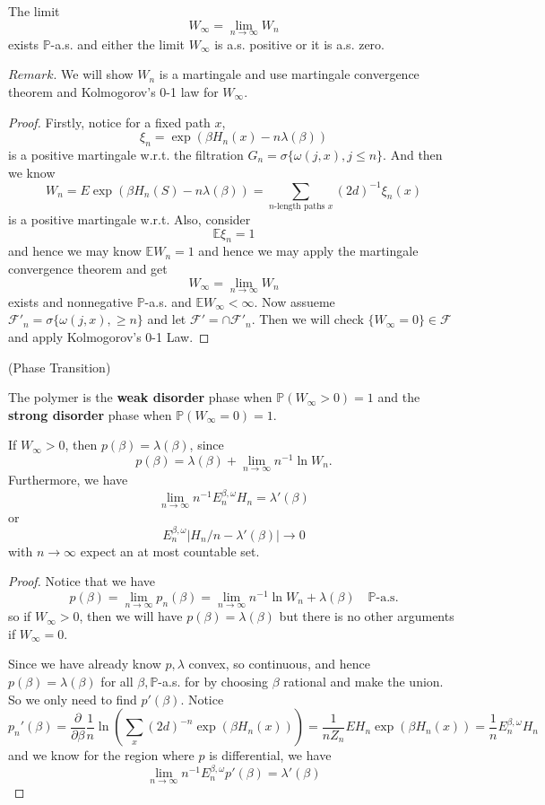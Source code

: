 \begin{theorem}
    The limit
    \[W_{\infty} = \lim\limits_{n\to\infty} W_n\]
    exists $\mathbb{P}$-a.s. and either the limit $W_{\infty}$ is a.s. positive or it is a.s. zero.
\end{theorem}
$Remark$. We will show $W_n$ is a martingale and use martingale convergence theorem and Kolmogorov's 0-1 law for $W_{\infty}$.
\begin{proof}
    Firstly, notice for a fixed path $x$,
    \[
    \xi_n = \exp{(\beta H_n(x)- n\lambda(\beta))}
    \]
    is a positive martingale w.r.t. the filtration $G_n = \sigma\{\omega(j,x), j\leq n\}$. And then we know
    \[
    W_n = E \exp(\beta H_n(S) - n\lambda(\beta)) = \sum\limits_{n\text{-length paths }x}(2d)^{-1} \xi_n(x)
    \]
    is a positive martingale w.r.t. Also, consider
    \[
    \mathbb{E}\xi_n = 1 
    \]
    and hence we may know $\mathbb{E}W_n = 1$ and hence we may apply the martingale convergence theorem and get
    \[
    W_{\infty} = \lim_{n\to\infty} W_n
    \]
    exists and nonnegative $\mathbb{P}$-a.s. and $\mathbb{E}W_{\infty} < \infty$. Now assueme $\mathcal{F}'_n = \sigma\{\omega(j,x), \geq n\}$ and let $\mathcal{F}' = \cap \mathcal{F}'_n$. Then we will check $\{W_{\infty} = 0\} \in \mathcal{F}$ and apply Kolmogorov's 0-1 Law.
\end{proof}

\begin{definition}
    (Phase Transition)\par
    The polymer is the \textbf{weak disorder} phase when $\mathbb{P}(W_{\infty} > 0) = 1$ and the \textbf{strong disorder} phase when $\mathbb{P}(W_{\infty} = 0) = 1$.
\end{definition}

\begin{proposition}
    If $W_{\infty} > 0$, then $p(\beta) = \lambda(\beta)$, since
    \[
    p(\beta) = \lambda(\beta) + \lim_{n\to\infty} n^{-1}\ln W_n.
    \]
    Furthermore, we have
    \[
    \lim_{n\to\infty} n^{-1}E_n^{\beta,\omega}H_n = \lambda'(\beta)
    \]
    or
    \[
    E_n^{\beta,\omega} |H_n/n- \lambda'(\beta)| \to 0
    \]
    with $n\to\infty$ expect an at most countable set.
\end{proposition}
\begin{proof}
    Notice that we have
    \[p(\beta) = \lim_{n\to\infty} p_n(\beta) = \lim_{n\to\infty}n^{-1}\ln W_n + \lambda(\beta)\quad\mathbb{P}\text{-a.s.}\]
    so if $W_{\infty} > 0$, then we will have $p(\beta) = \lambda(\beta)$ but there is no other arguments if $W_{\infty} = 0$.\par
    Since we have already know $p,\lambda$ convex, so continuous, and hence $p(\beta) = \lambda(\beta)$ for all $\beta, \mathbb{P}$-a.s. for by choosing $\beta$ rational and make the union. So we only need to find $p'(\beta)$. Notice
    \[
    p_n'(\beta) = \dfrac{\partial}{\partial \beta} \dfrac{1}{n}\ln(\sum\limits_{x} (2d)^{-n} \exp(\beta H_n(x))) = \dfrac{1}{nZ_n}EH_n \exp(\beta H_n(x)) = \dfrac{1}{n}E_{n}^{\beta,\omega}H_n
    \]
    and we know for the region where $p$ is differential, we have
    \[
    \lim_{n\to\infty} n^{-1} E_n^{\beta,\omega} p'(\beta) = \lambda'(\beta)
    \]
\end{proof}

